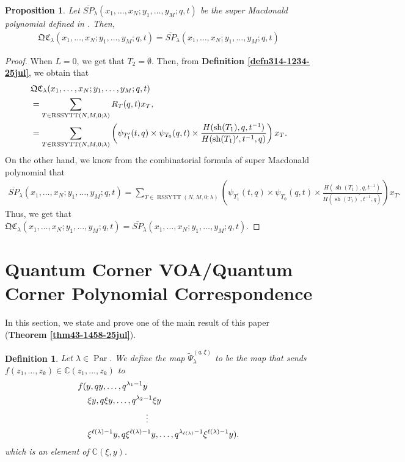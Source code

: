\documentclass[12pt,reqno,a4paper]{amsart}
\newcommand{\bb}[1]{\mathbb{#1}}
\numberwithin{equation}{section}
\newtheorem{prop}[thm]{Proposition}
\newtheorem{dfn}[thm]{Definition}
\newcommand{\supermac}{\overline{SP}}
\newcommand{\quantumcorner}{\mathfrak{QC}}
\newcommand{\dualmap}{
\widetilde{\Psi}^{(q,\xi)}_{\lambda}
}
\theoremstyle{definition}
\begin{document}
\begin{prop}
Let $\supermac_\lambda(x_1,\dots,x_N;y_1,\dots,y_M;q,t)$ be the super Macdonald polynomial defined in \cite{CSW2025}. Then, 
\begin{align}
\quantumcorner_\lambda(x_1,\dots,x_N;y_1,\dots,y_M;q,t) = 
\supermac_\lambda(x_1,\dots,x_N;y_1,\dots,y_M;q,t)  
\end{align}
\end{prop}
\begin{proof}
When $L = 0$, we get that $T_2 = \emptyset$. Then, from \textbf{Definition \ref{defn314-1234-25jul}}, we obtain that 
\begin{align}
&\quantumcorner_\lambda(x_1,\dots,x_N;y_1,\dots,y_M;q,t) 
\\
&=
\sum_{T \in \operatorname{RSSYTT}(N,M,0;\lambda)}
R_T(q,t)x_T,
\notag 
\\
&= 
\sum_{T \in \operatorname{RSSYTT}(N,M,0;\lambda)}
\left(
\psi_{T^{\prime}_{1}}(t,q) \times \psi_{T_0}(q,t)
\times
\frac{
	H(\operatorname{sh}(T_1),q,t^{-1})
}{
	H(\operatorname{sh}(T_1)^\prime,t^{-1},q)
}
\right)x_T.
\notag  
\end{align}
On the other hand, we know from the combinatorial formula of super Macdonald polynomial \cite{CSW2025} that 
\footnotesize
\begin{align}
\supermac_\lambda(x_1,\dots,x_N;y_1,\dots,y_M;q,t)  
= 
\sum_{T \in \operatorname{RSSYTT}(N,M,0;\lambda)}
\left(
\psi_{T^{\prime}_{1}}(t,q) \times \psi_{T_0}(q,t)
\times
\frac{
	H(\operatorname{sh}(T_1),q,t^{-1})
}{
	H(\operatorname{sh}(T_1)^\prime,t^{-1},q)
}
\right)x_T. 
\end{align}
\normalsize
Thus, we get that $\quantumcorner_\lambda(x_1,\dots,x_N;y_1,\dots,y_M;q,t) = 
\supermac_\lambda(x_1,\dots,x_N;y_1,\dots,y_M;q,t)$. 
\end{proof}


\section{Quantum Corner VOA/Quantum Corner Polynomial Correspondence}
\label{sec4-0012}

In this section, we state and prove one of the main result of this paper (\textbf{Theorem \ref{thm43-1458-25jul}}). 

\begin{dfn}
Let $\lambda \in \operatorname{Par}$. We define the map $\dualmap$ to be the map that sends $f(z_1,\dots,z_k) \in \bb{C}(z_1,\dots,z_k)$ to 
\begin{align}
	&f(y,qy,\dots,q^{\lambda_1 - 1}y
	\notag	\\
	&\hspace{0.4cm} \xi y,q\xi y,\dots,q^{\lambda_2 - 1}\xi y
	\notag \\
	&\hspace{2.8cm}\vdots
	\notag \\
	&\hspace{0.4cm} \xi^{\ell(\lambda) - 1} y,q\xi^{\ell(\lambda) - 1} y,\dots,q^{\lambda_{\ell(\lambda)} - 1}\xi^{\ell(\lambda) - 1} y). 
\end{align}
which is an element of $\bb{C}(\xi, y)$. 
\end{dfn}
\end{document}
